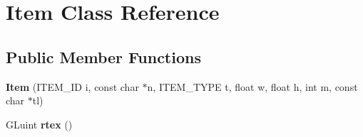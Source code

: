 \hypertarget{classItem}{}\section{Item Class Reference}
\label{classItem}
\subsection*{Public Member Functions}
\begin{DoxyCompactItemize}
\item 
\hypertarget{classItem_a77eab49b757d200509868e2961a39174}{}{\bfseries Item} (I\+T\+E\+M\+\_\+\+I\+D i, const char $\ast$n, I\+T\+E\+M\+\_\+\+T\+Y\+P\+E t, float w, float h, int m, const char $\ast$tl)\label{classItem_a77eab49b757d200509868e2961a39174}

\item 
\hypertarget{classItem_abd8a2c585eaee924ca99724d236466ab}{}G\+Luint {\bfseries rtex} ()\label{classItem_abd8a2c585eaee924ca99724d236466ab}

\end{DoxyCompactItemize}
